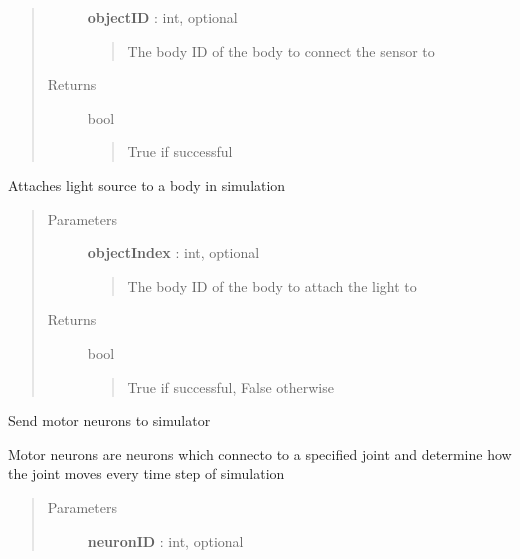 \documentclass[letterpaper,10pt,english]{sphinxmanual}
\begin{document}
\begin{fulllineitems}
\begin{fulllineitems}
\begin{quote}
\begin{description}
\textbf{objectID} : int, optional
\begin{quote}

The body ID of the body to connect the sensor to
\end{quote}

\item[{Returns}] \leavevmode
bool
\begin{quote}

True if successful
\end{quote}

\end{description}\end{quote}

\end{fulllineitems}


\begin{fulllineitems}
\label{code:pyrosim.PYROSIM.Send_Light_Source}
Attaches light source to a body in simulation
\begin{quote}\begin{description}
\item[{Parameters}] \leavevmode
\textbf{objectIndex} : int, optional
\begin{quote}

The body ID of the body to attach the light to
\end{quote}

\item[{Returns}] \leavevmode
bool
\begin{quote}

True if successful, False otherwise
\end{quote}

\end{description}\end{quote}

\end{fulllineitems}


\begin{fulllineitems}
\label{code:pyrosim.PYROSIM.Send_Motor_Neuron}
Send motor neurons to simulator

Motor neurons are neurons which connecto to a specified joint and 
determine how the joint moves every time step of simulation
\begin{quote}\begin{description}
\item[{Parameters}] \leavevmode
\textbf{neuronID} : int, optional
\begin{quote}


\end{quote}
\end{description}
\end{quote}
\end{fulllineitems}
\end{fulllineitems}
\end{document}
